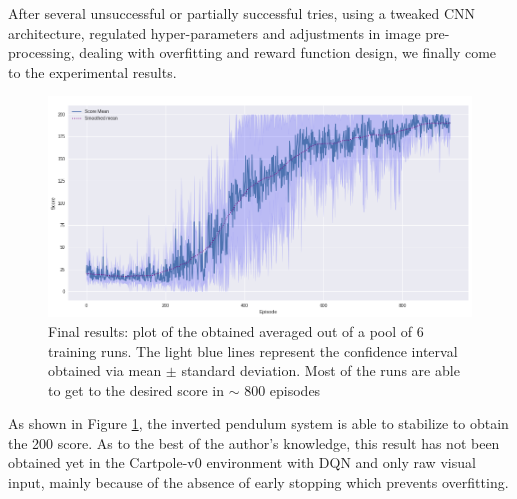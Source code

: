 \documentclass[11pt]{article}
\begin{document}
After several unsuccessful or partially successful tries, using a tweaked CNN architecture, regulated hyper-parameters and adjustments in image pre-processing, dealing with overfitting and reward function design, we finally come to the experimental results.
\medskip
\begin{figure}
    \centering
    \includegraphics[width=\linewidth]{plot_score.png}
    \caption{Final results: plot of the obtained averaged out of a pool of 6 training runs. The light blue lines represent the confidence interval obtained via mean $\pm$ standard deviation. Most of the runs are able to get to the desired score in $\sim$ 800 episodes}
    \label{fig:results}
\end{figure}
As shown in Figure \ref{fig:results}, the inverted pendulum system is able to stabilize to obtain the 200 score. As to the best of the author's knowledge, this result has not been obtained yet in the Cartpole-v0 environment with DQN and only raw visual input, mainly because of the absence of early stopping which prevents overfitting.\\

\end{document}
